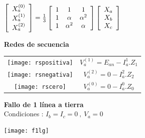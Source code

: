 \documentclass[11pt,a4paper,twocolumn]{article}
\begin{document}
\begin{cajita}
\begin{center}
		$\left[ 
	\begin{array}{c}
			X_{a}^{(0)}\\ X_{a}^{(1)}\\	X_{a}^{(2)}
	\end{array}
	\right] 
	= \frac{1}{3}
	\left[ 
	\begin{array}{c c c}
		1&1&1\\
		1&\alpha&\alpha^{2}\\
		1&\alpha^{2}&\alpha
	\end{array}
	\right] 
	\left[ 
	\begin{array}{c}
		X_{a}\\		X_{b}\\		X_{c}
	\end{array}
	\right]$
\end{center}
	\textbf{Redes de secuencia}\\
\begin{tabular}{c c}
	\texttt{[image: rspositiva]}& $  V_{a}^{(1)}= E_{an} -I_{a}^{1}.Z_{1}$\\
	\texttt{[image: rsnegativa]}& $  V_{a}^{(2)}= 0 -I_{a}^{2}.Z_{2}$\\
	\texttt{[image: rscero]}& $  V_{a}^{(0)}= 0 -I_{a}^{0}.Z_{0}$
\end{tabular}

\textbf{Fallo de 1 línea a tierra}\\
Condiciones : $ I_{b}=I_{c}=0~,~V_{a}=0 $
\begin{center}
	\vspace{-0.2cm}
	\texttt{[image: f1lg]}\\
\end{center}
\end{cajita}
\newpage
\end{document}
